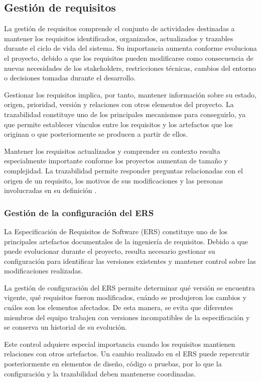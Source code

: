 \documentclass[journal,onecolumn]{IEEEtran}
\begin{document}
	\subsection{Gestión de requisitos}
	
	La gestión de requisitos comprende el conjunto de actividades destinadas a mantener los requisitos identificados, organizados, actualizados y trazables durante el ciclo de vida del sistema. Su importancia aumenta conforme evoluciona el proyecto, debido a que los requisitos pueden modificarse como consecuencia de nuevas necesidades de los stakeholders, restricciones técnicas, cambios del entorno o decisiones tomadas durante el desarrollo.
	
	Gestionar los requisitos implica, por tanto, mantener información sobre su estado, origen, prioridad, versión y relaciones con otros elementos del proyecto. La trazabilidad constituye uno de los principales mecanismos para conseguirlo, ya que permite establecer vínculos entre los requisitos y los artefactos que los originan o que posteriormente se producen a partir de ellos.
	
	Mantener los requisitos actualizados y comprender su contexto resulta especialmente importante conforme los proyectos aumentan de tamaño y complejidad. La trazabilidad permite responder preguntas relacionadas con el origen de un requisito, los motivos de sus modificaciones y las personas involucradas en su definición \cite{Mucha2024}.
	
	\subsubsection{Gestión de la configuración del ERS}
	
	La Especificación de Requisitos de Software (ERS) constituye uno de los principales artefactos documentales de la ingeniería de requisitos. Debido a que puede evolucionar durante el proyecto, resulta necesario gestionar su configuración para identificar las versiones existentes y mantener control sobre las modificaciones realizadas.
	
	La gestión de configuración del ERS permite determinar qué versión se encuentra vigente, qué requisitos fueron modificados, cuándo se produjeron los cambios y cuáles son los elementos afectados. De esta manera, se evita que diferentes miembros del equipo trabajen con versiones incompatibles de la especificación y se conserva un historial de su evolución.
	
	Este control adquiere especial importancia cuando los requisitos mantienen relaciones con otros artefactos. Un cambio realizado en el ERS puede repercutir posteriormente en elementos de diseño, código o pruebas, por lo que la configuración y la trazabilidad deben mantenerse coordinadas.
	
\end{document}
